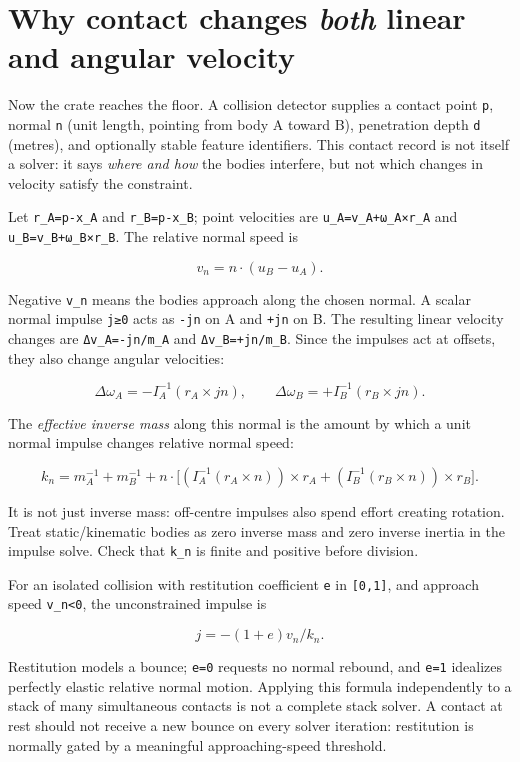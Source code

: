 \section{\texorpdfstring{Why contact changes \emph{both} linear and angular velocity}{Why contact changes both linear and angular velocity}}\label{06-engine-ii-ch033-why-contact-changes-both-linear-and-angular-velocity}

Now the crate reaches the floor. A collision detector supplies a contact point \texttt{p}, normal \texttt{n} (unit length, pointing from body A toward B), penetration depth \texttt{d} (metres), and optionally stable feature identifiers. This contact record is not itself a solver: it says \emph{where and how} the bodies interfere, but not which changes in velocity satisfy the constraint.

Let \texttt{r\_A=p-x\_A} and \texttt{r\_B=p-x\_B}; point velocities are \texttt{u\_A=v\_A+ω\_A×r\_A} and \texttt{u\_B=v\_B+ω\_B×r\_B}. The relative normal speed is

\[
v_n=n\cdot(u_B-u_A).
\]

Negative \texttt{v\_n} means the bodies approach along the chosen normal. A scalar normal impulse \texttt{j≥0} acts as \texttt{-jn} on A and \texttt{+jn} on B. The resulting linear velocity changes are \texttt{Δv\_A=-jn/m\_A} and \texttt{Δv\_B=+jn/m\_B}. Since the impulses act at offsets, they also change angular velocities:

\[
\Delta\omega_A=-I_A^{-1}(r_A\times jn),\qquad
\Delta\omega_B=+I_B^{-1}(r_B\times jn).
\]

The \emph{effective inverse mass} along this normal is the amount by which a unit normal impulse changes relative normal speed:

\[
k_n=m_A^{-1}+m_B^{-1}
+n\cdot\Big[
(I_A^{-1}(r_A\times n))\times r_A
+(I_B^{-1}(r_B\times n))\times r_B
\Big].
\]

It is not just inverse mass: off-centre impulses also spend effort creating rotation. Treat static/kinematic bodies as zero inverse mass and zero inverse inertia in the impulse solve. Check that \texttt{k\_n} is finite and positive before division.

For an isolated collision with restitution coefficient \texttt{e} in \texttt{{[}0,1{]}}, and approach speed \texttt{v\_n\textless{}0}, the unconstrained impulse is

\[
j=-(1+e)v_n/k_n.
\]

Restitution models a bounce; \texttt{e=0} requests no normal rebound, and \texttt{e=1} idealizes perfectly elastic relative normal motion. Applying this formula independently to a stack of many simultaneous contacts is not a complete stack solver. A contact at rest should not receive a new bounce on every solver iteration: restitution is normally gated by a meaningful approaching-speed threshold.

